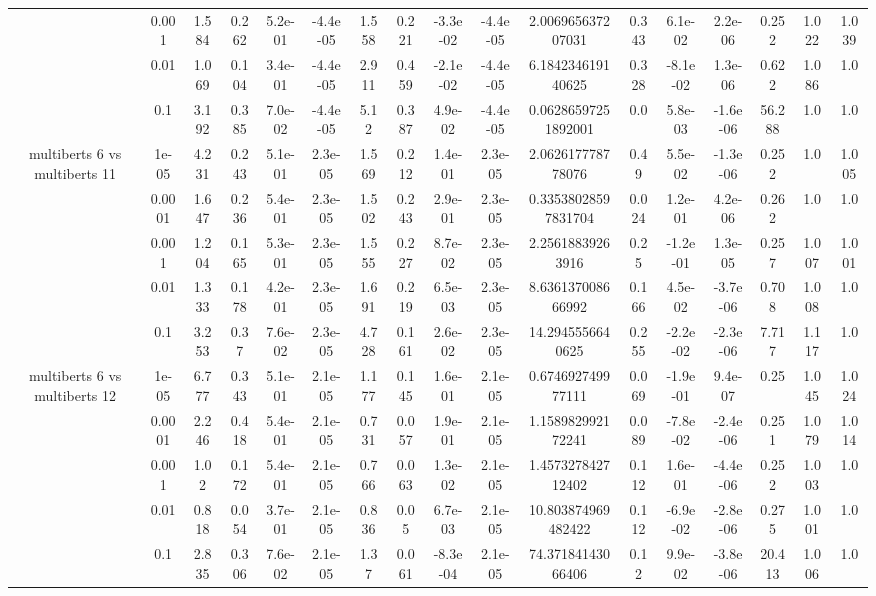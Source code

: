 \begin{tabular}{|c|c|c|c|c|c|c|c|c|c|c|c|c|c|c|c|c|}
 & 0.001 & 1.584 & 0.262 & 5.2e-01 & -4.4e-05 & 1.558 & 0.221 & -3.3e-02 & -4.4e-05 & 2.006965637207031 & 0.343 & 6.1e-02 & 2.2e-06 & 0.252 & 1.022 & 1.039 \\
 & 0.01 & 1.069 & 0.104 & 3.4e-01 & -4.4e-05 & 2.911 & 0.459 & -2.1e-02 & -4.4e-05 & 6.184234619140625 & 0.328 & -8.1e-02 & 1.3e-06 & 0.622 & 1.086 & 1.0 \\
 & 0.1 & 3.192 & 0.385 & 7.0e-02 & -4.4e-05 & 5.12 & 0.387 & 4.9e-02 & -4.4e-05 & 0.06286597251892001 & 0.0 & 5.8e-03 & -1.6e-06 & 56.288 & 1.0 & 1.0 \\
\hline
\multirow{5}{*}{multiberts 6 vs multiberts 11} & 1e-05 & 4.231 & 0.243 & 5.1e-01 & 2.3e-05 & 1.569 & 0.212 & 1.4e-01 & 2.3e-05 & 2.062617778778076 & 0.49 & 5.5e-02 & -1.3e-06 & 0.252 & 1.0 & 1.005 \\
 & 0.0001 & 1.647 & 0.236 & 5.4e-01 & 2.3e-05 & 1.502 & 0.243 & 2.9e-01 & 2.3e-05 & 0.33538028597831704 & 0.024 & 1.2e-01 & 4.2e-06 & 0.262 & 1.0 & 1.0 \\
 & 0.001 & 1.204 & 0.165 & 5.3e-01 & 2.3e-05 & 1.555 & 0.227 & 8.7e-02 & 2.3e-05 & 2.25618839263916 & 0.25 & -1.2e-01 & 1.3e-05 & 0.257 & 1.007 & 1.001 \\
 & 0.01 & 1.333 & 0.178 & 4.2e-01 & 2.3e-05 & 1.691 & 0.219 & 6.5e-03 & 2.3e-05 & 8.636137008666992 & 0.166 & 4.5e-02 & -3.7e-06 & 0.708 & 1.008 & 1.0 \\
 & 0.1 & 3.253 & 0.37 & 7.6e-02 & 2.3e-05 & 4.728 & 0.161 & 2.6e-02 & 2.3e-05 & 14.2945556640625 & 0.255 & -2.2e-02 & -2.3e-06 & 7.717 & 1.117 & 1.0 \\
\hline
\multirow{5}{*}{multiberts 6 vs multiberts 12} & 1e-05 & 6.777 & 0.343 & 5.1e-01 & 2.1e-05 & 1.177 & 0.145 & 1.6e-01 & 2.1e-05 & 0.674692749977111 & 0.069 & -1.9e-01 & 9.4e-07 & 0.25 & 1.045 & 1.024 \\
 & 0.0001 & 2.246 & 0.418 & 5.4e-01 & 2.1e-05 & 0.731 & 0.057 & 1.9e-01 & 2.1e-05 & 1.158982992172241 & 0.089 & -7.8e-02 & -2.4e-06 & 0.251 & 1.079 & 1.014 \\
 & 0.001 & 1.02 & 0.172 & 5.4e-01 & 2.1e-05 & 0.766 & 0.063 & 1.3e-02 & 2.1e-05 & 1.457327842712402 & 0.112 & 1.6e-01 & -4.4e-06 & 0.252 & 1.003 & 1.0 \\
 & 0.01 & 0.818 & 0.054 & 3.7e-01 & 2.1e-05 & 0.836 & 0.05 & 6.7e-03 & 2.1e-05 & 10.803874969482422 & 0.112 & -6.9e-02 & -2.8e-06 & 0.275 & 1.001 & 1.0 \\
 & 0.1 & 2.835 & 0.306 & 7.6e-02 & 2.1e-05 & 1.37 & 0.061 & -8.3e-04 & 2.1e-05 & 74.37184143066406 & 0.12 & 9.9e-02 & -3.8e-06 & 20.413 & 1.006 & 1.0 \\

\end{tabular}
